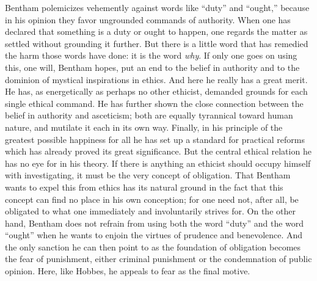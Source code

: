 \documentclass[12pt,a4paper,openany]{book}
\newcommand{\opage}[1]{\marginnote{\footnotesize\textit{[#1]}}}
\begin{document}
Bentham polemicizes vehemently against words like ``duty'' and ``ought,''
because in his opinion they favor \opage{26}ungrounded commands of authority.
When one has declared that something is a duty or ought to happen, one regards
the matter as settled without grounding it further. But there is a little word
that has remedied the harm those words have done: it is the word \emph{why}.
If only one goes on using this, one will, Bentham hopes, put an end to the
belief in authority and to the dominion of mystical inspirations in ethics.
And here he really has a great merit. He has, as energetically as perhaps no
other ethicist, demanded grounds for each single ethical command. He has
further shown the close connection between the belief in authority and
asceticism; both are equally tyrannical toward human nature, and mutilate it
each in its own way. Finally, in his principle of the greatest possible
happiness for all he has set up a standard for practical reforms which has
already proved its great significance. But the central ethical relation he has
no eye for in his theory. If there is anything an ethicist should occupy
himself with investigating, %
it must be the very concept of obligation. That Bentham wants to expel this
from ethics has its natural ground in the fact that this concept can find no
place in his own conception; for one need not, after all, be obligated to what
one immediately and involuntarily strives for. On the other hand, Bentham does
not refrain from using both the word ``duty'' and the word ``ought'' when he
wants to enjoin the virtues of prudence and benevolence. And the only sanction
he can then point to as the foundation of obligation becomes the fear of
punishment, either criminal punishment \opage{27}or the condemnation of public
opinion. Here, like Hobbes, he appeals to fear as the final motive.
\end{document}
